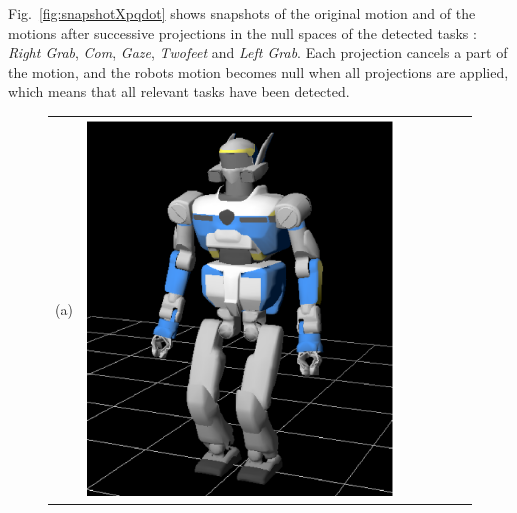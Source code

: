 \documentclass[letterpaper, 10pt, conference]{ieeeconf}      %
\begin{document}
Fig.~\ref{fig:snapshotXpqdot} shows snapshots of the original motion
and of the motions after successive projections
in the null spaces of the detected
tasks : \emph{Right Grab}, \emph{Com}, \emph{Gaze}, \emph{Twofeet} and \emph{Left Grab}.
Each projection cancels a part of the motion, and the robots motion becomes null when all
projections are applied,
which means that all relevant tasks have been detected.
\begin{figure}[t]
\centering
\begin{tabular}{c@{}c@{}c@{}c@{}c@{}c@{}c}
(a)&
\parbox[c]{2.2cm}{\includegraphics[width=\linewidth]{img/Pqdot0_0.png.ps}} &

\end{tabular}
\end{figure}
\end{document}
